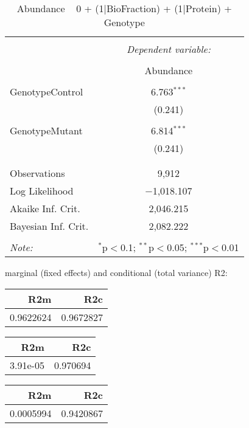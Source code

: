 \documentclass[11pt]{report}
\begin{document}
\begin{table}[!htbp] \centering 
  \caption{Abundance ~ 0 + (1|BioFraction) + (1|Protein) + Genotype} 
  \label{} 
\begin{tabular}{@{\extracolsep{5pt}}lc} 
\\[-1.8ex]\hline 
\hline \\[-1.8ex] 
 & \multicolumn{1}{c}{\textit{Dependent variable:}} \\ 
\cline{2-2} 
\\[-1.8ex] & Abundance \\ 
\hline \\[-1.8ex] 
 GenotypeControl & 6.763$^{***}$ \\ 
  & (0.241) \\ 
  & \\ 
 GenotypeMutant & 6.814$^{***}$ \\ 
  & (0.241) \\ 
  & \\ 
\hline \\[-1.8ex] 
Observations & 9,912 \\ 
Log Likelihood & $-$1,018.107 \\ 
Akaike Inf. Crit. & 2,046.215 \\ 
Bayesian Inf. Crit. & 2,082.222 \\ 
\hline 
\hline \\[-1.8ex] 
\textit{Note:}  & \multicolumn{1}{r}{$^{*}$p$<$0.1; $^{**}$p$<$0.05; $^{***}$p$<$0.01} \\ 
\end{tabular} 
\end{table} 
marginal (fixed effects) and conditional (total variance) R2:

\begin{tabular}{r|r}
\hline
R2m & R2c\\
\hline
0.9622624 & 0.9672827\\
\hline
\end{tabular}

\begin{tabular}{r|r}
\hline
R2m & R2c\\
\hline
3.91e-05 & 0.970694\\
\hline
\end{tabular}

\begin{tabular}{r|r}
\hline
R2m & R2c\\
\hline
0.0005994 & 0.9420867\\
\hline
\end{tabular}
\end{document}
